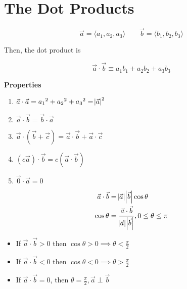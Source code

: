 \section{The Dot Products}

\begin{definition}
	\begin{equation}
		\vec a = \langle a_1, a_2, a_3 \rangle \qquad \vec b = \langle b_1, b_2, b_3 \rangle
	\end{equation}

	Then, the dot product is

	\begin{equation}
		\vec a \cdot \vec b \equiv a_1 b_1 + a_2 b_2 + a_3 b_3 
	\end{equation}
\end{definition}

\textbf{Properties}

\begin{enumerate}[1.]
	\item $\vec a \cdot \vec a = {a_1}^2 + {a_2}^2 + {a_3}^2 = \abs{\vec a}^2$
	\item $\vec a \cdot \vec b = \vec b \cdot \vec a$
	\item $\vec a \cdot (\vec b + \vec c) = \vec a \cdot \vec b + \vec a \cdot \vec c$
	\item $(c\vec a) \cdot \vec b = c(\vec a \cdot \vec b)$
	\item $\vec 0 \cdot \vec a = 0$
\end{enumerate}

\begin{theorem}
	\begin{align}
		\vec a \cdot \vec b &= \abs{\vec a} \abs{\vec b} \cos\theta\\
		\cos\theta &= \frac{\vec a \cdot \vec b}{\abs{\vec a} \abs{\vec b}}, 0 \leq \theta \leq \pi
	\end{align}
\end{theorem}

\begin{lemma}
	\begin{itemize}
		\item If $\vec a \cdot \vec b > 0$ then $\cos \theta > 0 \implies \theta < \frac{\pi}{2}$
		\item If $\vec a \cdot \vec b < 0$ then $\cos \theta < 0 \implies \theta > \frac{\pi}{2}$
		\item If $\vec a \cdot \vec b = 0$, then $\theta = \frac{\pi}{2}, \vec a \perp \vec b$
	\end{itemize}
\end{lemma}

